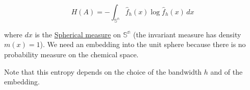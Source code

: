 \[ H(A) = -\int_\mathbb{{S}^n}  \hat{f}_h(x)\log  \hat{f}_h(x) \,dx  \]



where $dx$ is the \href{http://}{Spherical measure} on $\mathbb{{S}^n}$ (the invariant measure has density $m(x)=1$). We need an embedding into the unit sphere because there is no probability measure on the chemical space.

Note that this entropy depends on the choice of the bandwidth $h$ and of the embedding.
